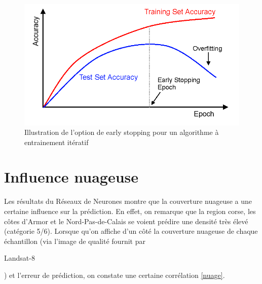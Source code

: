 \documentclass{book}
\begin{document}
\begin{figure}[H]
\centerline{
\includegraphics[scale=0.5]{images/earlystopping.png}
}
\caption{Illustration de l'option de \og early stopping \fg{} pour un algorithme à entrainement itératif}
\label{early}
\end{figure}


\section{Influence nuageuse}

Les résultats du Réseaux de Neurones montre que la couverture nuageuse a une certaine influence sur la prédiction.
En effet, on remarque que la region corse, les côtes d'Armor et le Nord-Pas-de-Calais se voient prédire une densité très élevé (catégorie 5/6). Lorsque qu'on 
affiche d'un côté la couverture nuageuse de chaque échantillon (via l'image de qualité fournit par \begin{itshape}Landsat-8\end{itshape}) et 
l'erreur de prédiction, on constate une certaine corrélation \ref{nuage}.
\end{document}
